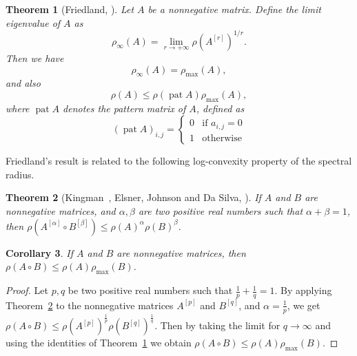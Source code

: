 \documentclass[a4paper]{amsart}
\theoremstyle{definition}
\theoremstyle{plain}
\newtheorem{thm}{Theorem}
\newtheorem{cor}[thm]{Corollary}
\theoremstyle{remark}
\begin{document}
\begin{thm}[Friedland, \cite{friedland}]
 \label{friedland_thm}
 Let $A$ be a nonnegative matrix. Define the \emph{limit eigenvalue} of $A$ as
 \[
  \rho_{\infty}(A) = \lim_{r \to +\infty} \rho(A^{[r]})^{1/r}.
 \]
 Then we have
 \begin{equation}
 \rho_{\infty}(A) = \rho_{\max}(A),
 \end{equation}
 and also
 \[
 \rho (A) {\leqslant} \rho(\operatorname{pat} A)\rho_{\max}(A),
 \]
 where $\operatorname{pat} A$ denotes the pattern matrix of $A$, defined as
 \[
  {(\operatorname{pat} A)}_{i,j} = 
   \begin{cases}
    0 &\mbox{if } a_{i,j} = 0\\
    1 &\mbox{otherwise}
   \end{cases}
 \]
\end{thm}

Friedland's result is related to the following log-convexity
property of the spectral radius. 

\begin{thm}[Kingman~\cite{kingman}, Elsner, Johnson and Da Silva, \cite{elsner}]
\label{elsner_thm}
If $A$ and $B$ are nonnegative matrices,
and $\alpha, \beta$ are two positive real numbers such that $\alpha + \beta = 1$,
then $\rho(A^{[\alpha]} \circ B^{[\beta]}) {\leqslant} \rho(A)^\alpha \rho(B)^\beta$.
\end{thm}

\begin{cor}\label{cor-gen-friedland}
If $A$ and $B$ are nonnegative matrices, then $\rho(A \circ B) {\leqslant} \rho(A) \rho_{\max}(B)$.
\end{cor}
\begin{proof}
Let $p, q$ be two positive real numbers such that $\frac{1}{p} + \frac{1}{q} = 1$.
By applying Theorem~\ref{elsner_thm} to the nonnegative matrices $A^{[p]}$ and $B^{[q]}$, and $\alpha=\frac{1}{p}$,
we get $\rho(A \circ B) {\leqslant} \rho(A^{[p]})^\frac{1}{p} \rho(B^{[q]})^\frac{1}{q}$.
Then by taking the limit for $q \to \infty$ and using the identities of Theorem~\ref{friedland_thm}
we obtain $\rho(A \circ B) {\leqslant} \rho(A) \rho_{\max}(B)$.
\end{proof}
\end{document}
